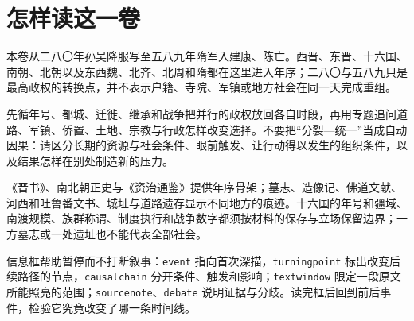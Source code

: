 \chapter*{怎样读这一卷}

本卷从二八〇年孙吴降服写至五八九年隋军入建康、陈亡。西晋、东晋、十六国、南朝、北朝以及东西魏、北齐、北周和隋都在这里进入年序；二八〇与五八九只是最高政权的转换点，并不表示户籍、寺院、军镇或地方社会在同一天完成重组。



先循年号、都城、迁徙、继承和战争把并行的政权放回各自时段，再用专题追问道路、军镇、侨置、土地、宗教与行政怎样改变选择。不要把“分裂—统一”当成自动因果：请区分长期的资源与社会条件、眼前触发、让行动得以发生的组织条件，以及结果怎样在别处制造新的压力。

《晋书》、南北朝正史与《资治通鉴》提供年序骨架；墓志、造像记、佛道文献、河西和吐鲁番文书、城址与道路遗存显示不同地方的痕迹。十六国的年号和疆域、南渡规模、族群称谓、制度执行和战争数字都须按材料的保存与立场保留边界；一方墓志或一处遗址也不能代表全部社会。

信息框帮助暂停而不打断叙事：\texttt{event} 指向首次深描，\texttt{turningpoint} 标出改变后续路径的节点，\texttt{causalchain} 分开条件、触发和影响；\texttt{textwindow} 限定一段原文所能照亮的范围；\texttt{sourcenote}、\texttt{debate} 说明证据与分歧。读完框后回到前后事件，检验它究竟改变了哪一条时间线。
